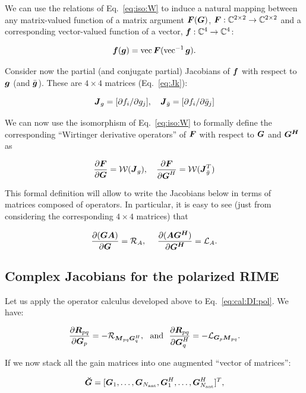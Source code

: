 \documentclass[useAMS,usenatbib]{mn2e}
\newcommand{\COMPLEX}{\mathbb{C}}
\newcommand{\mat}[1]{{\bmath{#1}}}
\newcommand{\JJ}{\mat{J}} %
\newcommand{\MM}{\mat{M}}
\newcommand{\RR}{\mat{R}}
\newcommand{\GG}{\mat{G}}
\begin{document}
We can use the relations of Eq.~\ref{eq:iso:W} to induce a natural mapping between any matrix-valued function of a 
matrix argument $\mat{F}(\mat{G})$, $\mat{F}:\COMPLEX^{2\times2}\to\COMPLEX^{2\times2}$ and a corresponding 
vector-valued function of a vector, $\bmath{f}:\COMPLEX^4\to\COMPLEX^4$:

\[
\bmath{f}(\bmath{g}) = \VEC{\mat{F}(\VECINV{\bmath{g}})}.
\]

Consider now the partial (and conjugate partial) Jacobians of $\bmath{f}$ with respect to $\bmath{g}$ 
(and $\bar{\bmath{g}}$). These are $4\times4$ matrices (Eq.~\ref{eq:Jk}):

\[
\JJ_g = [ \partial f_i / \partial g_j ],~~~\JJ_{\bar{g}} = [ \partial f_i / \partial \bar{g}_j ]
\]

We can now use the isomorphism of Eq.~\ref{eq:iso:W} to formally define the corresponding ``Wirtinger derivative operators'' 
of $\mat{F}$ with respect to $\mat{G}$ and $\mat{G^H}$ as

\begin{equation}
\label{eq:def:dF:dG}
\frac{\partial\mat{F}}{\partial{\mat{G}}} = \mathcal{W}(\JJ_g),~~~
\frac{\partial\mat{F}}{\partial{\mat{G}^H}} = \mathcal{W}(\JJ_{\bar{g}}^T)
\end{equation}

This formal definition will allow to write the Jacobians below in terms of matrices composed of operators. 
In particular, it is easy to see (just from considering the corresponding $4\times4$ matrices) that

\[
\frac{\partial(\mat{GA})}{\partial{\mat{G}}} = \Rop{A},~~~~\frac{\partial(\mat{AG^H})}{\partial{\mat{G^H}}} = \Lop{A}.
\]

\subsection{Complex Jacobians for the polarized RIME}

Let us apply the operator calculus developed above to Eq.~\ref{eq:cal:DI:pol}. We have:

\begin{equation}
\label{eq:dR:dG}
\frac{\partial\RR_{pq}}{\partial\GG_p} = -\Rop{\MM_{pq}\GG^H_q},\mathrm{~~and~~}
\frac{\partial\RR_{pq}}{\partial\GG^H_q} = -\Lop{\GG_p \MM_{pq}}.
\end{equation}

If we now stack all the gain matrices into one augmented ``vector of matrices'':

\begin{equation}
\label{eq:GGvec}
\GGg = [ \GG_1,\dots,\GG_{\scriptstyle \Na},\GG^H_1,\dots,\GG^H_{\scriptstyle \Na} ]^T,
\end{equation}
\end{document}

